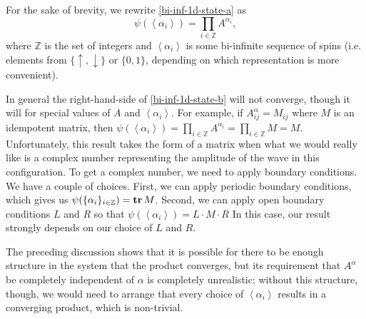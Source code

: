 \documentclass{article}
\newcommand{\seq}[1]{\left<#1\right>}
\newcommand{\tr}{\text{\textbf{tr}}\,}
\newcommand{\Z}{\mathbb{Z}}
\begin{document}
For the sake of brevity, we rewrite \eqref{bi-inf-1d-state-a} as
\begin{equation}
\label{bi-inf-1d-state-b}
\psi(\seq{\alpha_i}) = \prod_{i\in\Z} A^{\alpha_i},
\end{equation}
where $\Z$ is the set of integers and $\seq{\alpha_i}$ is some bi-infinite sequence of spins (i.e. elements from $\{\uparrow,\downarrow\}$ or $\{0,1\}$, depending on which representation is more convenient).

In general the right-hand-side of \eqref{bi-inf-1d-state-b} will not converge, though it will for special values of $A$ and $\seq{\alpha_i}$.  For example, if $A^\alpha_{ij}=M_{ij}$ where $M$ is an idempotent matrix, then $\psi(\seq{\alpha_i})=\prod_{i\in\Z} A^{\alpha_i} = \prod_{i\in\Z} M = M$.  Unfortunately, this result takes the form of a matrix when what we would really like is a complex number representing the amplitude of the wave in this configuration.  To get a complex number, we need to apply boundary conditions.  We have a couple of choices.  First, we can apply periodic boundary conditions, which gives us $\psi(\{\alpha_i\}_{i\in\Z})=\tr M$.  Second, we can apply open boundary conditions $L$ and $R$ so that $\psi(\seq{\alpha_i})=L\cdot M\cdot R$  In this case, our result strongly depends on our choice of $L$ and $R$.

The preceding discussion shows that it is possible for there to be enough structure in the system that the product converges, but its requirement that $A^\alpha$ be completely independent of $\alpha$ is completely unrealistic;  without this structure, though, we would need to arrange that every choice of $\seq{\alpha_i}$ results in a converging product, which is non-trivial.
\end{document}
